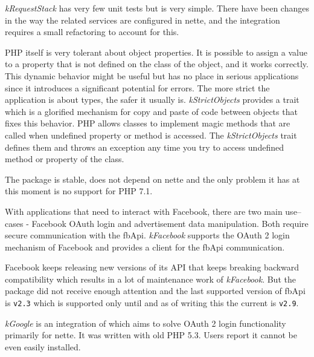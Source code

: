 \textit{\gls{kRequestStack}} has very few unit tests but is very simple. There have been changes in the way the related services are configured in \gls{nette}, and the integration requires a small refactoring to account for this.

 \label{sec:state:strict-objects}

PHP itself is very tolerant about object properties. It is possible to assign a value to a property that is not defined on the class of the object, and it works correctly. This dynamic behavior might be useful but has no place in serious applications since it introduces a significant potential for errors. The more strict the application is about types, the safer it usually is. \textit{\gls{kStrictObjects}} provides a trait which is a glorified mechanism for copy and paste of code between objects that fixes this behavior. PHP allows classes to implement magic methods that are called when undefined property or method is accessed. The \textit{\gls{kStrictObjects}} trait defines them and throws an exception any time you try to access undefined method or property of the class.

The package is stable, does not depend on \gls{nette} and the only problem it has at this moment is no support for PHP 7.1.

 \label{sec:state:facebook}

With applications that need to interact with Facebook, there are two main use--cases - Facebook OAuth login and advertisement data manipulation. Both require secure communication with the \gls{fbApi}. \textit{\gls{kFacebook}} supports the OAuth 2 login mechanism of Facebook and provides a client for the \gls{fbApi} communication.

Facebook keeps releasing new versions of its API that keeps breaking backward compatibility which results in a lot of maintenance work of \textit{\gls{kFacebook}}. But the package did not receive enough attention and the last supported version of \gls{fbApi} is \lstinline{v2.3} which is supported only until  and as of writing this the current  is \lstinline{v2.9}.

 \label{sec:state:google}

\textit{\gls{kGoogle}} is an integration of  which aims to solve OAuth 2 login functionality primarily for \gls{nette}. It was written with old PHP 5.3. Users report it cannot be even easily installed.

